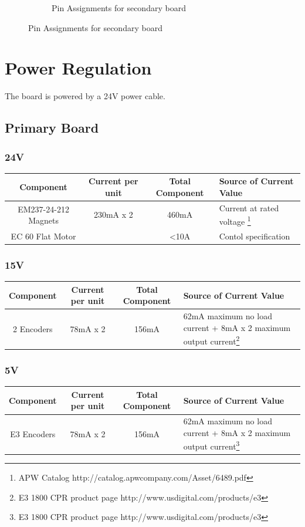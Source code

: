 \documentclass{article}
\begin{document}
\begin{figure}[h!]
\begin{subfigure}{0.4\textwidth}
		\caption{Pin Assignments for secondary board}
		\label{pinout2}
	\end{subfigure}
\end{figure}

\section{Power Regulation}
The board is powered by a 24V power cable. 
\subsection{Primary Board}
\subsubsection*{24V}
\begin{longtable}{|c | c | c |  >{\centering\arraybackslash}p{} |} \hline
Component & Current per unit & Total Component & Source of Current Value\\ \hline
EM237-24-212 Magnets & 230mA x 2 & 460mA & Current at rated voltage \footnote{APW Catalog http://catalog.apwcompany.com/Asset/6489.pdf}\\ \hline
EC 60 Flat Motor & & <10A & Contol specification\\ \hline
\end{longtable}
\subsubsection*{15V}
\begin{longtable}{|c | c | c |  >{\centering\arraybackslash}p{} |} \hline
Component & Current per unit & Total Component & Source of Current Value\\ \hline
2 Encoders & 78mA x 2 & 156mA & 62mA maximum no load current + 8mA x 2 maximum output current\footnote{E3 1800 CPR product page http://www.usdigital.com/products/e3}\\ \hline
\end{longtable}
\subsubsection*{5V}
\begin{longtable}{|c | c | c |  >{\centering\arraybackslash}p{} |} \hline
Component & Current per unit & Total Component & Source of Current Value\\ \hline
E3 Encoders & 78mA x 2 & 156mA & 62mA maximum no load current + 8mA x 2 maximum output current\footnote{E3 1800 CPR product page http://www.usdigital.com/products/e3}\\ \hline
\end{longtable}
\end{document}
